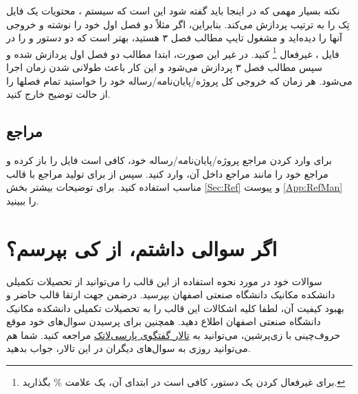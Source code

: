 نکته بسیار مهمی که در اینجا باید گفته شود این است که سیستم \lr{\TeX}، محتویات یک فایل تِک را به ترتیب پردازش می‌کند.  بنابراین، اگر مثلاً  دو فصل اول خود را نوشته و خروجی آنها را دیده‌اید و مشغول تایپ مطالب فصل ۳ هستید، بهتر است
که دو دستور 
\verb!!
و
\verb!!
را در فایل 
،
غیرفعال%
\footnote{
	برای غیرفعال کردن یک دستور، کافی است در ابتدای آن، یک علامت
	\%
	بگذارید.
}
کنید.  در غیر این صورت، ابتدا مطالب دو فصل اول  پردازش شده و سپس مطالب فصل ۳ پردازش می‌شود و این کار باعث طولانی شدن زمان اجرا می‌شود. هر زمان که خروجی کل پروژه/پایان‌نامه/رساله خود را خواستید تمام فصلها را از حالت توضیح خارج کنید.
\subsection{مراجع}
برای وارد کردن مراجع پروژه/پایان‌نامه/رساله خود، کافی است فایل 
را باز کرده و مراجع خود را مانند مراجع داخل آن، وارد کنید.  سپس از  برای تولید مراجع با قالب مناسب استفاده کنید. برای توضیحات بیشتر بخش \ref{Sec:Ref} و پیوست \ref{App:RefMan} را ببینید.



\section{اگر سوالی داشتم، از کی بپرسم؟}
سوالات خود در مورد نحوه استفاده از این قالب را می‌توانید از تحصیلات تکمیلی دانشکده مکانیک دانشگاه صنعتی اصفهان بپرسید. درضمن جهت ارتقا قالب حاضر و بهبود کیفیت آن، لطفا کلیه اشکالات این قالب را به تحصیلات تکمیلی دانشکده مکانیک دانشگاه صنعتی اصفهان اطلاع دهید.
همچنین برای پرسیدن سوال‌های خود موقع حروف‌چینی با زی‌پرشین،  می‌توانید به
\href{http://forum.parsilatex.com}{تالار گفتگوی پارسی‌لاتک}%
مراجعه کنید. شما هم می‌توانید روزی به سوال‌های دیگران در این تالار، جواب بدهید.

